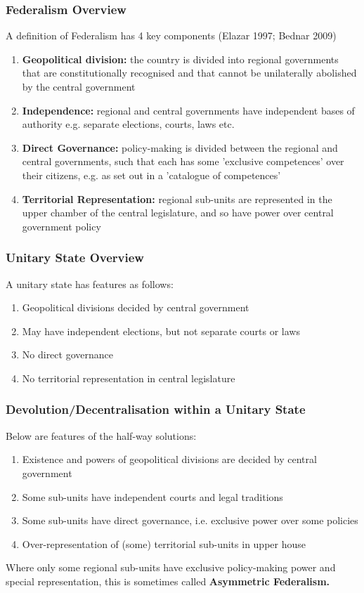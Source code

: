 \documentclass[12pt, letterpaper]{article}
\begin{document}
\subsubsection{Federalism Overview}
A definition of Federalism has 4 key components (Elazar 1997; Bednar 2009)
\begin{enumerate}
	\item \textbf{Geopolitical division:} the country is divided into regional governments that are constitutionally recognised and that cannot be unilaterally abolished by the central government
	\item \textbf{Independence:} regional and central governments have independent bases of authority e.g. separate elections, courts, laws etc.
	\item \textbf{Direct Governance:} policy-making is divided between the regional and central governments, such that each has some 'exclusive competences' over their citizens, e.g. as set out in a 'catalogue of competences'
	\item \textbf{Territorial Representation:} regional sub-units are represented in the upper chamber of the central legislature, and so have power over central government policy
\end{enumerate}
\subsubsection{Unitary State Overview}
A unitary state has features as follows:
\begin{enumerate}
	\item Geopolitical divisions decided by central government
	\item May have independent elections, but not separate courts or laws
	\item No direct governance
	\item No territorial representation in central legislature
\end{enumerate}

\subsubsection{Devolution/Decentralisation within a Unitary State}
Below are features of the half-way solutions:
\begin{enumerate}
	\item Existence and powers of geopolitical divisions are decided by central government
	\item Some sub-units have independent courts and legal traditions
	\item Some sub-units have direct governance, i.e. exclusive power over some policies
	\item Over-representation of (some) territorial sub-units in upper house
\end{enumerate}
Where only some regional sub-units have exclusive policy-making power and special representation, this is sometimes called \textbf{Asymmetric Federalism.}
\end{document}
